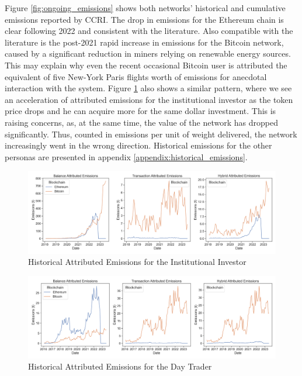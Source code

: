 \documentclass[11pt]{report}
\begin{document}
Figure \ref{fig:ongoing_emissions} shows both networks' historical and cumulative emissions reported by CCRI. The drop in emissions for the Ethereum chain is clear following 2022 and consistent with the literature. Also compatible with the literature is the post-2021 rapid increase in emissions for the Bitcoin network, caused by a significant reduction in miners relying on renewable energy sources. This may explain why even the recent occasional Bitcoin user is attributed the equivalent of five New-York Paris flights worth of emissions for anecdotal interaction with the system. Figure \ref{fig:attributed_investor} also shows a similar pattern, where we see an acceleration of attributed emissions for the institutional investor as the token price drops and he can acquire more for the same dollar investment. This is raising concerns, as, at the same time, the value of the network has dropped significantly. Thus, counted in emissions per unit of weight delivered, the network increasingly went in the wrong direction. Historical emissions for the other personas are presented in appendix \ref{appendix:historical_emissions}.


\begin{figure}[h!]
    \centering
    \centerline{\includegraphics[scale=0.4]{figures/attributed_em_invest.png}}
    \caption{Historical Attributed Emissions for the Institutional Investor}
    \label{fig:attributed_investor}
\end{figure}


\begin{figure}[h!]
    \centering
    \centerline{\includegraphics[scale=0.4]{figures/attributed_em_trader.png}}
    \caption{Historical Attributed Emissions for the Day Trader}
    \label{fig:attributed_trader}
\end{figure}
\end{document}
